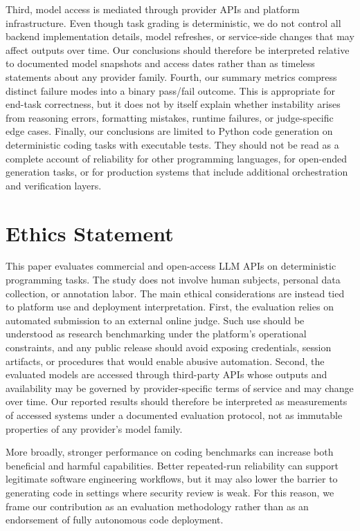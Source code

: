 \documentclass[11pt]{article}
\begin{document}
Third, model access is mediated through provider APIs and platform infrastructure. Even though task grading is deterministic, we do not control all backend implementation details, model refreshes, or service-side changes that may affect outputs over time. Our conclusions should therefore be interpreted relative to documented model snapshots and access dates rather than as timeless statements about any provider family. Fourth, our summary metrics compress distinct failure modes into a binary pass/fail outcome. This is appropriate for end-task correctness, but it does not by itself explain whether instability arises from reasoning errors, formatting mistakes, runtime failures, or judge-specific edge cases. Finally, our conclusions are limited to Python code generation on deterministic coding tasks with executable tests. They should not be read as a complete account of reliability for other programming languages, for open-ended generation tasks, or for production systems that include additional orchestration and verification layers.

\section{Ethics Statement}

This paper evaluates commercial and open-access LLM APIs on deterministic programming tasks. The study does not involve human subjects, personal data collection, or annotation labor. The main ethical considerations are instead tied to platform use and deployment interpretation. First, the evaluation relies on automated submission to an external online judge. Such use should be understood as research benchmarking under the platform's operational constraints, and any public release should avoid exposing credentials, session artifacts, or procedures that would enable abusive automation. Second, the evaluated models are accessed through third-party APIs whose outputs and availability may be governed by provider-specific terms of service and may change over time. Our reported results should therefore be interpreted as measurements of accessed systems under a documented evaluation protocol, not as immutable properties of any provider's model family.

More broadly, stronger performance on coding benchmarks can increase both beneficial and harmful capabilities. Better repeated-run reliability can support legitimate software engineering workflows, but it may also lower the barrier to generating code in settings where security review is weak. For this reason, we frame our contribution as an evaluation methodology rather than as an endorsement of fully autonomous code deployment.
\end{document}
